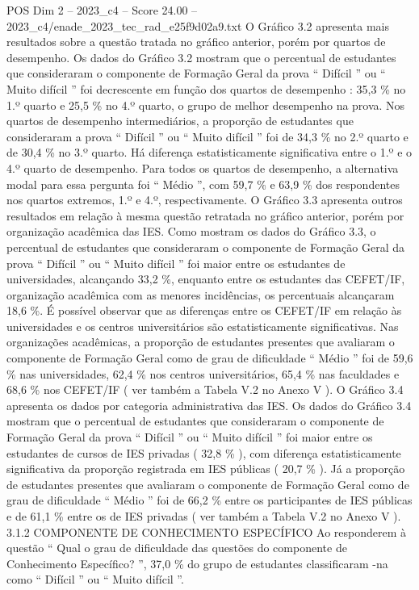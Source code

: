 \begin{textsample}{POS Dim 2 – 2023\_c4 – Score 24.00 – 2023\_c4/enade\_2023\_tec\_rad\_e25f9d02a9.txt}
O Gráfico 3.2 apresenta mais resultados sobre a questão tratada no gráfico anterior, porém por quartos de desempenho.
Os dados do Gráfico 3.2 mostram que o percentual de estudantes que consideraram o componente de Formação Geral da prova “ Difícil ” ou “ Muito difícil ” foi decrescente em função dos quartos de desempenho : 35,3 \% no 1.º quarto e 25,5 \% no 4.º quarto, o grupo de melhor desempenho na prova.
Nos quartos de desempenho intermediários, a proporção de estudantes que consideraram a prova “ Difícil ” ou “ Muito difícil ” foi de 34,3 \% no 2.º quarto e de 30,4 \% no 3.º quarto.
Há diferença estatisticamente significativa entre o 1.º e o 4.º quarto de desempenho.
Para todos os quartos de desempenho, a alternativa modal para essa pergunta foi “ Médio ”, com 59,7 \% e 63,9 \% dos respondentes nos quartos extremos, 1.º e 4.º, respectivamente.
O Gráfico 3.3 apresenta outros resultados em relação à mesma questão retratada no gráfico anterior, porém por organização acadêmica das IES.
Como mostram os dados do Gráfico 3.3, o percentual de estudantes que consideraram o componente de Formação Geral da prova “ Difícil ” ou “ Muito difícil ” foi maior entre os estudantes de universidades, alcançando 33,2 \%, enquanto entre os estudantes das CEFET/IF, organização acadêmica com as menores incidências, os percentuais alcançaram 18,6 \%.
É possível observar que as diferenças entre os CEFET/IF em relação às universidades e os centros universitários são estatisticamente significativas.
Nas organizações acadêmicas, a proporção de estudantes presentes que avaliaram o componente de Formação Geral como de grau de dificuldade “ Médio ” foi de 59,6 \% nas universidades, 62,4 \% nos centros universitários, 65,4 \% nas faculdades e 68,6 \% nos CEFET/IF ( ver também a Tabela V.2 no Anexo V ).
O Gráfico 3.4 apresenta os dados por categoria administrativa das IES.
Os dados do Gráfico 3.4 mostram que o percentual de estudantes que consideraram o componente de Formação Geral da prova “ Difícil ” ou “ Muito difícil ” foi maior entre os estudantes de cursos de IES privadas ( 32,8 \% ), com diferença estatisticamente significativa da proporção registrada em IES públicas ( 20,7 \% ).
Já a proporção de estudantes presentes que avaliaram o componente de Formação Geral como de grau de dificuldade “ Médio ” foi de 66,2 \% entre os participantes de IES públicas e de 61,1 \% entre os de IES privadas ( ver também a Tabela V.2 no Anexo V ). 3.1.2 COMPONENTE DE CONHECIMENTO ESPECÍFICO Ao responderem à questão “ Qual o grau de dificuldade das questões do componente de Conhecimento Específico? ”, 37,0 \% do grupo de estudantes classificaram -na como “ Difícil ” ou “ Muito difícil ”.

\end{textsample}
